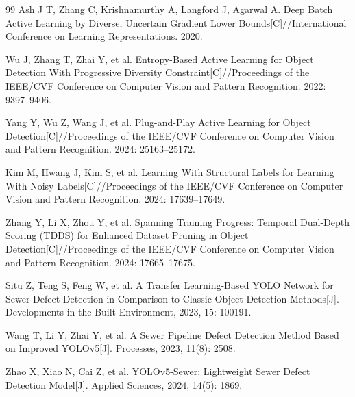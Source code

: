 \documentclass[UTF8,openany,12pt]{ctexbook}
\begin{document}
\begin{thebibliography}{99}
Ash J T, Zhang C, Krishnamurthy A, Langford J, Agarwal A. Deep Batch Active Learning by Diverse, Uncertain Gradient Lower Bounds[C]//International Conference on Learning Representations. 2020.

Wu J, Zhang T, Zhai Y, et al. Entropy-Based Active Learning for Object Detection With Progressive Diversity Constraint[C]//Proceedings of the IEEE/CVF Conference on Computer Vision and Pattern Recognition. 2022: 9397--9406.

Yang Y, Wu Z, Wang J, et al. Plug-and-Play Active Learning for Object Detection[C]//Proceedings of the IEEE/CVF Conference on Computer Vision and Pattern Recognition. 2024: 25163--25172.

Kim M, Hwang J, Kim S, et al. Learning With Structural Labels for Learning With Noisy Labels[C]//Proceedings of the IEEE/CVF Conference on Computer Vision and Pattern Recognition. 2024: 17639--17649.

Zhang Y, Li X, Zhou Y, et al. Spanning Training Progress: Temporal Dual-Depth Scoring (TDDS) for Enhanced Dataset Pruning in Object Detection[C]//Proceedings of the IEEE/CVF Conference on Computer Vision and Pattern Recognition. 2024: 17665--17675.

Situ Z, Teng S, Feng W, et al. A Transfer Learning-Based YOLO Network for Sewer Defect Detection in Comparison to Classic Object Detection Methods[J]. Developments in the Built Environment, 2023, 15: 100191.

Wang T, Li Y, Zhai Y, et al. A Sewer Pipeline Defect Detection Method Based on Improved YOLOv5[J]. Processes, 2023, 11(8): 2508.

Zhao X, Xiao N, Cai Z, et al. YOLOv5-Sewer: Lightweight Sewer Defect Detection Model[J]. Applied Sciences, 2024, 14(5): 1869.
\end{thebibliography}
\end{document}

